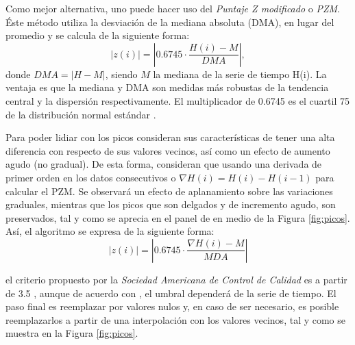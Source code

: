 Como mejor alternativa, uno puede hacer uso del \emph{Puntaje Z modificado} o \emph{PZM}. Éste método utiliza la desviación de la mediana absoluta (DMA), en lugar del promedio y se calcula de la siguiente forma:
\begin{equation}
    |z(i)| = | 0.6745 \cdot \frac{H(i) - M}{DMA}|,
\end{equation}
donde $DMA = |H-M|$, siendo $M$ la mediana de la serie de tiempo H(i). La ventaja es que la mediana y DMA son medidas más robustas de la tendencia central y la dispersión respectivamente. El multiplicador de 0.6745 es el cuartil 75 de la distribución normal estándar \parencite{removing_with_Whitaker-Hayes}.

Para poder lidiar con los picos \cite{WHITAKER2018, removing_with_Whitaker-Hayes} consideran sus características de tener una alta diferencia con respecto de sus valores vecinos, así como un efecto de aumento agudo (no gradual). De esta forma, consideran que usando una derivada de primer orden en los datos consecutivos o $\nabla H(i) = H(i)- H(i-1)$ para calcular el PZM. Se observará un efecto de aplanamiento sobre las variaciones graduales, mientras que los picos que son delgados y de incremento agudo, son preservados, tal y como se aprecia en el panel de en medio de la Figura \ref{fig:picos}. Así, el algoritmo se expresa de la siguiente forma:
\begin{equation}
    |z(i)| = | 0.6745 \cdot \frac{\nabla H(i) - M}{MDA}|
\end{equation}

el criterio propuesto por la \emph{Sociedad Americana de Control de Calidad} es a partir de 3.5 , aunque de acuerdo con \cite{removing_with_Whitaker-Hayes}, el umbral dependerá de la serie de tiempo. El paso final es reemplazar por valores nulos y, en caso de ser necesario, es posible reemplazarlos a partir de una interpolación con los valores vecinos, tal y como se muestra en la Figura \ref{fig:picos}.

